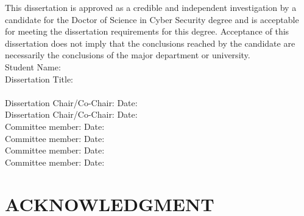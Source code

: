 \documentclass[12pt,openany]{book}
\begin{document}
\bigskip\smallskip

This dissertation is approved as a credible and independent investigation by a candidate for the Doctor of Science in Cyber Security degree and is acceptable for meeting the dissertation requirements for this degree. Acceptance of this dissertation does not imply that the conclusions reached by the candidate are necessarily the conclusions of the major department or university.\\

\noindent
Student Name: \underline{\hspace*{3.5in}}\\

\noindent
Dissertation Title: \underline{\hspace*{.8\linewidth}}\\

\noindent
\underline{\hspace*{\linewidth}}\\

\noindent
Dissertation Chair/Co-Chair: \underline{\hspace*{2in}}\qquad Date: \underline{\hspace*{1.5in}} \\

\noindent
Dissertation Chair/Co-Chair: \underline{\hspace*{2in}}\qquad Date: \underline{\hspace*{1.5in}} \\   

\noindent
Committee member: \underline{\hspace*{2in}}\qquad Date: \underline{\hspace*{1.5in}} \\    

\noindent
Committee member: \underline{\hspace*{2in}}\qquad Date: \underline{\hspace*{1.5in}}\\    

\noindent
Committee member: \underline{\hspace*{2in}}\qquad Date: \underline{\hspace*{1.5in}}\\ 

\noindent
Committee member: \underline{\hspace*{2in}}\qquad Date: \underline{\hspace*{1.5in}}    

\chapter*{ACKNOWLEDGMENT}
\end{document}
